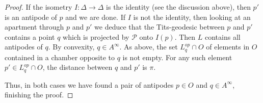 \documentclass[12pt,leqno]{amsart}
\numberwithin{equation}{section}
\newtheorem{lem}[thm]{Lemma}
\theoremstyle{remark}
\begin{document}
\begin{proof}
If the isometry $I:\Delta \to \Delta$ is the identity (see the discussion above), then $p'$ is an antipode of $p$ and we are done.  If $I$ is not the identity, then looking at an apartment through $p$ and $p'$ we deduce that the Tits-geodesic between $p$ and $p'$ contains a point $q$ which is projected by $\mathcal P$ onto $I(p)$.  Then  $L$ contains all antipodes of $q$. By convexity, $q\in A^{\infty}$. As above, the set 
 $L^{op} _q \cap O$ of elements in $O$  contained in a chamber opposite to $q$ is not empty.
 For any such element $p'\in L^{op} _q\cap O$, the distance between $q$ and $p'$ is $\pi$.
 
 Thus, in both cases we have found a pair of antipodes $p\in O$ and $q\in A^{\infty}$, finishing the proof. 
\end{proof}


	

	


{

\sloppy

\printbibliography[heading=bibintoc]

\fussy

}
\end{document}
